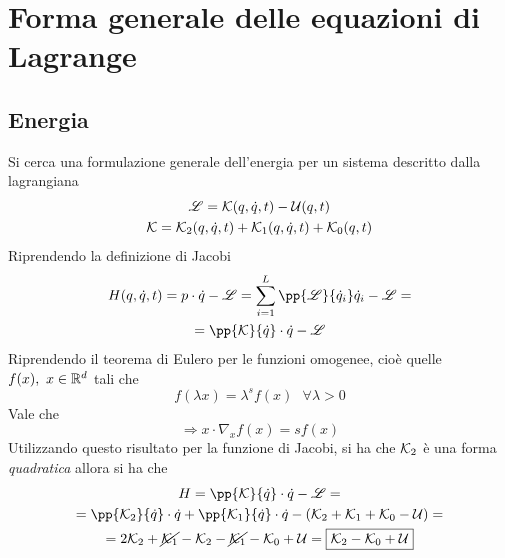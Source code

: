 \documentclass[Main.tex]{subfiles}
\begin{document}
\section{Forma generale delle equazioni di Lagrange}
\toc

\subsection{Energia}

Si cerca una formulazione generale dell'energia per un sistema descritto dalla lagrangiana
\begin{gather}
	\mathscr{L} = \mathcal{K} (q, \dot q,t) - \mathcal{U}(q,t) \\
	\mathcal{K}= \mathcal{K}_2 (q, \dot q, t) + \mathcal{K}_1(q, \dot q ,t) + \mathcal{K}_0 (q,t)
\end{gather}
Riprendendo la definizione di Jacobi
\begin{gather}
	H(q,\dot q,t)= p \cdot \dot q - \L = \sum_{i=1}^L \pp{\L}{\dot q_i} \dot q_i - \L=\\
	= \pp{\K}{\dot q} \cdot \dot q - \L
\end{gather}
Riprendendo il teorema di Eulero per le funzioni omogenee, cioè quelle $f(x), \ x \in \mathbb{R}^d$ tali che
\begin{equation}
	f(\lambda x) = \lambda ^s f(x) \ \ \ \forall \lambda >0
\end{equation}
Vale che 
\begin{equation}
	\Rightarrow x \cdot \nabla_x f(x) = s f(x)
\end{equation}
Utilizzando questo risultato per la funzione di Jacobi, si ha che $\mathcal{K}_2$ è una forma \emph{quadratica} allora si ha che 
\begin{gather}
	H=\pp{\K}{\dot q} \cdot \dot q - \L =\\
	= \pp{\K_2}{\dot q} \cdot \dot q + \pp{\K_1}{\dot q} \cdot \dot q - (\K_2 + \K_1 + \K_0 - \U)=\\
	=2 \K_2 + \cancel{\K_1} - \K_2 - \cancel{\K_1} - \K_0 + \U = \boxed{\K_2 - \K_0 + \U}
\end{gather}
\end{document}
